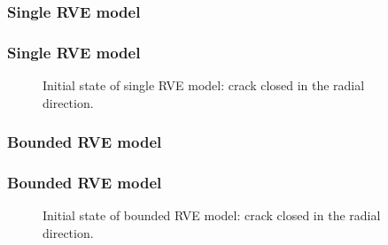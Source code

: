 \documentclass[first,firstsupp,lastsupp,handout,last,hyperref,table]{ETHclass}
\begin{document}
\begin{frame}
\frametitle{Single RVE model}
\vspace{-0.5cm}
\centering
\begin{figure}[!h]
\centering
{}\quad
{}
  \label{fig:singleRVE_ccoc}
\end{figure}
\end{frame}

\begin{frame}
\frametitle{Single RVE model}
\vspace{-0.75cm}
\centering
\begin{figure}[!h]
\centering
  \caption{\scriptsize Initial state of single RVE model: crack closed in the radial direction.}
  \label{fig:singleRVE_onlycc}
\end{figure}
\end{frame}


\begin{frame}
\frametitle{Bounded RVE model}
\vspace{-0.75cm}
\centering
\begin{figure}[!h]
\centering
{}\quad
{}
  \label{fig:boundedRVE_ccoc}
\end{figure}
\end{frame}

\begin{frame}
\frametitle{Bounded RVE model}
\vspace{-0.75cm}
\centering
\begin{figure}[!h]
\centering
  \caption{\scriptsize Initial state of bounded RVE model: crack closed in the radial direction.}
  \label{fig:boundedRVE_onlycc}
\end{figure}
\end{frame}
\end{document}
